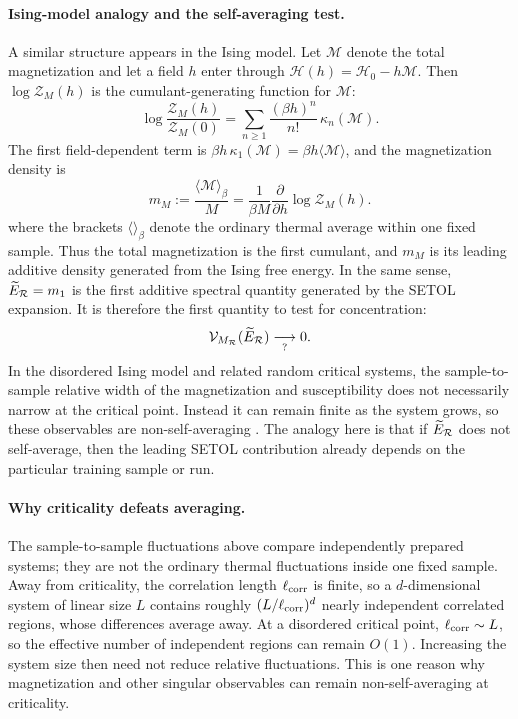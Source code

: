 \paragraph{Ising-model analogy and the self-averaging test.}
A similar structure appears in the Ising model. Let $\mathcal M$
denote the total magnetization and let a field $h$ enter through
$\mathcal H(h)=\mathcal H_0-h\mathcal M$. Then $\log\mathcal Z_M(h)$ is the
cumulant-generating function for $\mathcal M$:
\begin{equation}
\log\frac{\mathcal Z_M(h)}{\mathcal Z_M(0)}
=
\sum_{n\geq1}
\frac{(\beta h)^n}{n!}\,\kappa_n(\mathcal M).
\label{eq:ising_cumulant_expansion}
\end{equation}
The first field-dependent term is
$\beta h\,\kappa_1(\mathcal M)=\beta h\langle\mathcal M\rangle$, and the
magnetization density is
\begin{equation}
m_M
:=
\frac{\langle\mathcal M\rangle_{\beta}}{M}
=
\frac{1}{\beta M}
\frac{\partial}{\partial h}\log\mathcal Z_M(h).
\label{eq:ising_magnetization_first_cumulant}
\end{equation}
where the brackets $\langle\rangle_{\beta}$ denote the ordinary thermal average within one fixed sample.
Thus the total magnetization is the first
cumulant, and $m_M$ is its leading additive density generated from the Ising
free energy. In the same sense,
$\widetilde E_{\mathcal R}=m_1$ is the first additive spectral quantity
generated by the SETOL expansion. It is therefore the first quantity to test
for concentration:
\begin{equation}
\mathcal V_{M_{\mathcal R}}(\widetilde E_{\mathcal R})
\underset{?}{\longrightarrow} 0.
\label{eq:energy_selfavg_condition}
\end{equation}
In the disordered Ising model and related random critical systems, the
sample-to-sample relative width of the magnetization and susceptibility does
not necessarily narrow at the critical point. Instead it can remain finite as
the system grows, so these observables are non-self-averaging
\cite{WisemanDomany1995,aharony1996,wiseman1998}.
The analogy here is that if $\widetilde E_{\mathcal R}$ does not self-average, then the leading SETOL
contribution already depends on the particular training sample or run.
\paragraph{Why criticality defeats averaging.}
The sample-to-sample fluctuations above compare independently prepared
systems; they are not the ordinary thermal fluctuations inside one fixed
sample. Away from criticality, the correlation length $\ell_{\rm corr}$ is
finite, so a $d$-dimensional system of linear size $L$ contains roughly
$(L/\ell_{\rm corr})^d$ nearly independent correlated regions, whose
differences average away. At a disordered critical point,
$\ell_{\rm corr}\sim L$, so the effective number of independent regions can
remain $O(1)$. Increasing the system size then need not reduce relative
fluctuations. This is one reason why magnetization and other singular observables can
remain non-self-averaging at criticality.

